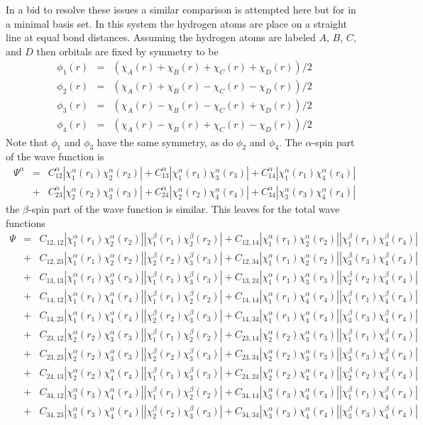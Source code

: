 \documentclass[pra,nofootinbib]{revtex4-1}
\newcommand{\Xs}[2]{\chi^{#1}_{#2}(r_{#2})}
\newcommand{\Xa}[1]{\Xs{\alpha}{#1}}
\newcommand{\XXa}[2]{|\Xs{\alpha}{#1}\Xs{\alpha}{#2}|}
\newcommand{\XXb}[2]{|\Xs{\beta}{#1}\Xs{\beta}{#2}|}
\newcommand{\Cs}[2]{C^{#1}_{#2}}
\newcommand{\Ca}[1]{\Cs{\alpha}{#1}}
\newcommand{\C}[2]{C_{{#1},{#2}}}
\begin{document}
In a bid to resolve these issues a similar comparison is attempted here but for  in
a minimal basis set. In this system the hydrogen atoms are place on a straight line at equal
bond distances. Assuming the hydrogen atoms are labeled $A$, $B$, $C$, and $D$ then orbitals
are fixed by symmetry to be
\begin{eqnarray}
  \phi_1(r) &=& (\chi_A(r)+\chi_B(r)+\chi_C(r)+\chi_D(r))/2 \\
  \phi_2(r) &=& (\chi_A(r)+\chi_B(r)-\chi_C(r)-\chi_D(r))/2 \\
  \phi_3(r) &=& (\chi_A(r)-\chi_B(r)-\chi_C(r)+\chi_D(r))/2 \\
  \phi_4(r) &=& (\chi_A(r)-\chi_B(r)+\chi_C(r)-\chi_D(r))/2
\end{eqnarray}
Note that $\phi_1$ and $\phi_3$ have the same symmetry, as do $\phi_2$ and $\phi_4$.
The $\alpha$-spin part of the wave function is 
\begin{eqnarray}
  \Psi^\alpha &=& \Ca{12}|\Xa{1}\Xa{2}|+\Ca{13}|\Xa{1}\Xa{3}|+\Ca{14}|\Xa{1}\Xa{4}| \nonumber \\
              &+& \Ca{23}|\Xa{2}\Xa{3}|+\Ca{24}|\Xa{2}\Xa{4}|+\Ca{34}|\Xa{3}\Xa{4}|
\end{eqnarray}
the $\beta$-spin part of the wave function is similar. This leaves for the total 
wave functions
\begin{eqnarray}
  \Psi &=& \C{12}{12}\XXa{1}{2}\XXb{1}{2}
        +  \C{12}{14}\XXa{1}{2}\XXb{1}{4} \nonumber \\
       &+& \C{12}{23}\XXa{1}{2}\XXb{2}{3}
        +  \C{12}{34}\XXa{1}{2}\XXb{3}{4} \nonumber \\
       &+& \C{13}{13}\XXa{1}{3}\XXb{1}{3}
        +  \C{13}{24}\XXa{1}{3}\XXb{2}{4} \nonumber \\
       &+& \C{14}{12}\XXa{1}{4}\XXb{1}{2}
        +  \C{14}{14}\XXa{1}{4}\XXb{1}{4} \nonumber \\
       &+& \C{14}{23}\XXa{1}{4}\XXb{2}{3}
        +  \C{14}{34}\XXa{1}{4}\XXb{3}{4} \nonumber \\
       &+& \C{23}{12}\XXa{2}{3}\XXb{1}{2}
        +  \C{23}{14}\XXa{2}{3}\XXb{1}{4} \nonumber \\
       &+& \C{23}{23}\XXa{2}{3}\XXb{2}{3}
        +  \C{23}{34}\XXa{2}{3}\XXb{3}{4} \nonumber \\
       &+& \C{24}{13}\XXa{2}{4}\XXb{1}{3}
        +  \C{24}{24}\XXa{2}{4}\XXb{2}{4} \nonumber \\
       &+& \C{34}{12}\XXa{3}{4}\XXb{1}{2}
        +  \C{34}{14}\XXa{3}{4}\XXb{1}{4} \nonumber \\
       &+& \C{34}{23}\XXa{3}{4}\XXb{2}{3}
        +  \C{34}{34}\XXa{3}{4}\XXb{3}{4} 
\end{eqnarray}
\end{document}
